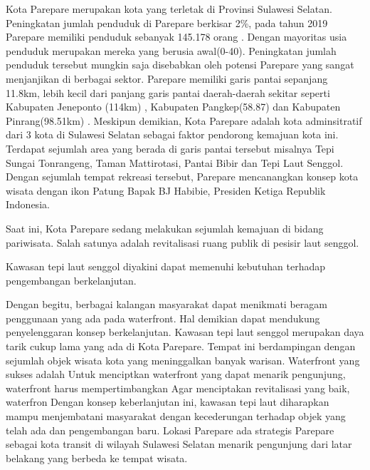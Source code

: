 \documentclass[../projects/thesis.tex]{subfiles}
\begin{document}
Kota Parepare merupakan kota yang terletak di Provinsi Sulawesi Selatan. Peningkatan jumlah penduduk di Parepare berkisar 2\%, pada tahun 2019 Parepare memiliki penduduk sebanyak 145.178 orang \citep{bpskotaparepare2020}. Dengan mayoritas usia penduduk  merupakan mereka yang berusia awal(0-40). Peningkatan jumlah penduduk tersebut mungkin saja disebabkan oleh potensi Parepare yang sangat menjanjikan di berbagai sektor.
Parepare memiliki garis pantai sepanjang 11.8km, lebih kecil dari panjang garis pantai daerah-daerah sekitar seperti Kabupaten Jeneponto (114km) \citep{wardasusaniati2011}, Kabupaten Pangkep(58.87) dan Kabupaten Pinrang(98.51km) \citep{goni2018}. Meskipun demikian, Kota Parepare adalah kota adminsitratif dari 3 kota di Sulawesi Selatan \citep{junaid2016} sebagai faktor pendorong kemajuan kota ini.
Terdapat sejumlah area yang berada di garis pantai tersebut misalnya Tepi Sungai Tonrangeng, Taman Mattirotasi, Pantai Bibir dan Tepi Laut Senggol.
Dengan sejumlah tempat rekreasi tersebut, Parepare mencanangkan konsep kota wisata dengan ikon Patung Bapak BJ Habibie, Presiden Ketiga Republik Indonesia.

Saat ini, Kota Parepare sedang melakukan sejumlah kemajuan di bidang pariwisata. Salah satunya adalah revitalisasi ruang publik di pesisir laut senggol.

Kawasan tepi laut senggol diyakini dapat memenuhi kebutuhan terhadap pengembangan berkelanjutan.



Dengan begitu, berbagai kalangan masyarakat dapat menikmati beragam penggunaan yang ada pada waterfront.
Hal demikian dapat mendukung penyelenggaran konsep berkelanjutan.
Kawasan tepi laut senggol merupakan daya tarik cukup lama yang ada di Kota Parepare.
Tempat ini berdampingan dengan sejumlah objek wisata kota yang meninggalkan banyak warisan. Waterfront yang sukses adalah
Untuk menciptkan waterfront yang dapat menarik pengunjung, waterfront harus mempertimbangkan
Agar menciptakan revitalisasi yang baik, waterfron
Dengan konsep keberlanjutan ini, kawasan tepi laut diharapkan mampu menjembatani masyarakat dengan kecederungan terhadap objek yang telah ada dan pengembangan baru.
Lokasi Parepare ada
strategis
Parepare sebagai kota transit di wilayah Sulawesi Selatan menarik pengunjung dari latar belakang yang berbeda ke tempat wisata.
\end{document}
